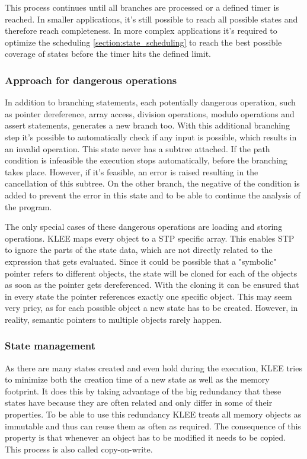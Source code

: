 This process continues until all branches are processed or a defined timer is reached. In smaller applications, it's still possible to reach all possible states and therefore reach completeness. In more complex applications it's required to optimize the scheduling \ref{section:state_scheduling} to reach the best possible coverage of states before the timer hits the defined limit.
\subsubsection{Approach for dangerous operations}\label{section:dangerous_operations}
In addition to branching statements, each potentially dangerous operation, such as pointer dereference, array access, division operations, modulo operations and assert statements, generates a new branch too. With this additional branching step it's possible to automatically check if any input is possible, which results in an invalid operation. This state never has a subtree attached. If the path condition is infeasible the execution stops automatically, before the branching takes place. However, if it's feasible, an error is raised resulting in the cancellation of this subtree. On the other branch, the negative of the condition is added to prevent the error in this state and to be able to continue the analysis of the program.

The only special cases of these dangerous operations are loading and storing operations. KLEE maps every object to a STP specific array. This enables STP to ignore the parts of the state data, which are not directly related to the expression that gets evaluated. Since it could be possible that a "symbolic" pointer refers to different objects, the state will be cloned for each of the objects as soon as the pointer gets dereferenced. With the cloning it can be ensured that in every state the pointer references exactly one specific object. This may seem very pricy, as for each possible object a new state has to be created. However, in reality, semantic pointers to multiple objects rarely happen. 

\subsubsection{State management}
As there are many states created and even hold during the execution, KLEE tries to minimize both the creation time of a new state as well as the memory footprint. It does this by taking advantage of the big redundancy that these states have because they are often related and only differ in some of their properties. To be able to use this redundancy KLEE treats all memory objects as immutable and thus can reuse them as often as required. The consequence of this property is that whenever an object has to be modified it needs to be copied. This process is also called copy-on-write.

